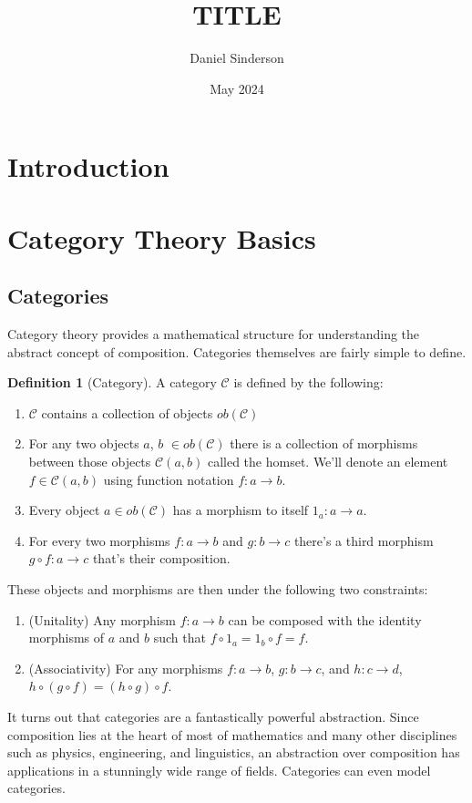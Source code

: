 \documentclass{article}
\title{TITLE}
\author{Daniel Sinderson}
\date{May 2024}
\theoremstyle{definition}
\newtheorem{definition}{Definition}
\begin{document}
\maketitle

\section*{Introduction}




\section*{Category Theory Basics}
\subsection*{Categories}
Category theory provides a mathematical structure for understanding the abstract concept of composition.
Categories themselves are fairly simple to define.
\begin{definition}[Category]
    A category $\mathcal{C}$ is defined by the following:
    \begin{enumerate}
        \item $\mathcal{C}$ contains a collection of objects $ob(\mathcal{C})$
        \item For any two objects $a$, $b$ $\in ob(\mathcal{C})$ there is a collection of morphisms between those objects $\mathcal{C}(a,b)$ called the homset. We'll denote an element $f\in\mathcal{C}(a,b)$ using function notation $f:a\rightarrow b$.
        \item Every object $a\in ob(\mathcal{C})$ has a morphism to itself $1_a:a\rightarrow a$.
        \item For every two morphisms $f:a\rightarrow b$ and $g: b\rightarrow c$ there's a third morphism $g\circ f:a\rightarrow c$ that's their composition.
    \end{enumerate}
    These objects and morphisms are then under the following two constraints:
    \begin{enumerate}
        \item (Unitality) Any morphism $f:a\rightarrow b$ can be composed with the identity morphisms of $a$ and $b$ such that $f\circ 1_a=1_b\circ f=f$.
        \item (Associativity) For any morphisms $f:a\rightarrow b$, $g:b\rightarrow c$, and $h:c\rightarrow d$, $h\circ (g\circ f)=(h\circ g)\circ f$.
    \end{enumerate}
\end{definition}
It turns out that categories are a fantastically powerful abstraction.
Since composition lies at the heart of most of mathematics and many other disciplines such as physics, engineering, and linguistics, an abstraction over composition has applications in a stunningly wide range of fields.
Categories can even model categories.
\end{document}
